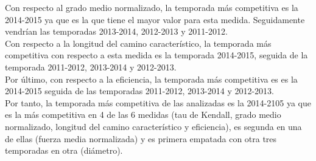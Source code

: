 Con respecto al grado medio normalizado, la temporada más competitiva es la 2014-2015 ya que es la que tiene el mayor valor para esta medida. Seguidamente vendrían las temporadas 2013-2014, 2012-2013 y 2011-2012.\\

Con respecto a la longitud del camino característico, la temporada más competitiva con respecto a esta medida es la temporada 2014-2015, seguida de la temporada 2011-2012, 2013-2014 y 2012-2013.\\

Por último, con respecto a la eficiencia, la temporada más competitiva es es la 2014-2015 seguida de las temporadas 2011-2012, 2013-2014 y 2012-2013.\\

Por tanto, la temporada más competitiva de las analizadas es la 2014-2105 ya que es la más competitiva en 4 de las 6 medidas (tau de Kendall, grado medio normalizado, longitud del camino característico y eficiencia), es segunda en una de ellas (fuerza media normalizada) y es primera empatada con otra tres temporadas en otra (diámetro). 
